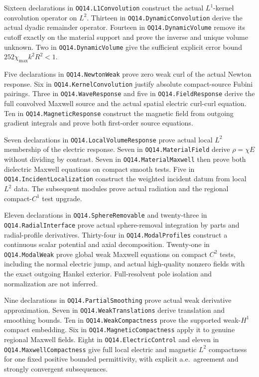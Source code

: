 Sixteen declarations in \texttt{OQ14.L1Convolution} construct the actual
$L^1$-kernel convolution operator on $L^2$. Thirteen in
\texttt{OQ14.DynamicConvolution} derive the actual dyadic remainder
operator. Fourteen in \texttt{OQ14.DynamicVolume} remove its cutoff exactly
on the material support and prove the inverse and unique volume unknown.
Two in \texttt{OQ14.DynamicVolume} give the sufficient explicit error bound
$252\chi_{\max}k^2R^2<1$.

Five declarations in \texttt{OQ14.NewtonWeak} prove zero weak curl of the
actual Newton response. Six in \texttt{OQ14.KernelConvolution} justify
absolute compact-source Fubini pairings. Three in \texttt{OQ14.WaveResponse}
and five in \texttt{OQ14.FieldResponse} derive the full convolved Maxwell
source and the actual spatial electric curl-curl equation. Ten in
\texttt{OQ14.MagneticResponse} construct the magnetic field from outgoing
gradient integrals and prove both first-order source equations.

Seven declarations in \texttt{OQ14.LocalVolumeResponse} prove actual local
$L^2$ membership of the electric response. Seven in
\texttt{OQ14.MaterialField} derive $\rho=\chi E$ without dividing by contrast.
Seven in \texttt{OQ14.MaterialMaxwell} then prove both dielectric Maxwell
equations on compact smooth tests. Five in
\texttt{OQ14.IncidentLocalization} construct the weighted incident datum
from local $L^2$ data. The subsequent modules prove actual radiation and
the regional compact-$C^1$ test upgrade.

Eleven declarations in \texttt{OQ14.SphereRemovable} and twenty-three in
\texttt{OQ14.RadialInterface} prove actual sphere-removal integration by
parts and radial-profile derivatives. Thirty-four in
\texttt{OQ14.ModalProfiles} construct a continuous scalar potential and
axial decomposition. Twenty-one in \texttt{OQ14.ModalWeak} prove global
weak Maxwell equations on compact $C^2$ tests, including the normal
electric jump, and actual high-quality nonzero fields with the exact
outgoing Hankel exterior. Full-resolvent pole isolation and normalization
are not inferred.

Nine declarations in \texttt{OQ14.PartialSmoothing} prove actual weak
derivative approximation. Seven in \texttt{OQ14.WeakTranslations} derive
translation and smoothing bounds. Ten in \texttt{OQ14.WeakCompactness}
prove the supported weak-$H^1$ compact embedding. Six in
\texttt{OQ14.MagneticCompactness} apply it to genuine regional Maxwell
fields. Eight in \texttt{OQ14.ElectricControl} and eleven in
\texttt{OQ14.MaxwellCompactness} give full local electric and magnetic
$L^2$ compactness for one fixed positive bounded permittivity, with
explicit a.e.\ agreement and strongly convergent subsequences.

